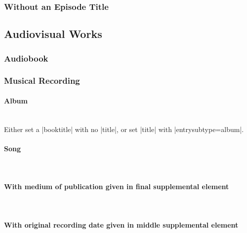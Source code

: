 \documentclass{ltxdockit}
\newcommand{\myparagraph}[1]{\paragraph{#1}\mbox{}\\}
\begin{document}
\subsubsection{Without an Episode Title} %
\label{sub:without_an_episode_title}
\begin{refsection}
	\printbibliography[heading=none]
\end{refsection}

\subsection{Audiovisual Works} %
\label{sec:audiovisual_works}
\subsubsection{Audiobook} %
\label{sub:audiobook}
\begin{refsection}
	\printbibliography[heading=none]
\end{refsection}
\subsubsection{Musical Recording} %
\label{sub:musical_recording}
\myparagraph{Album} %
\label{ssub:album}
Either set a |booktitle| with no |title|, or set |title| with  |entrysubtype={album}|.
\begin{refsection}
	\printbibliography[heading=none]
\end{refsection}
\myparagraph{Song} %
\label{ssub:song}
\begin{refsection}
	\printbibliography[heading=none]
\end{refsection}
\myparagraph{With medium of publication given in final supplemental element} %
\label{ssub:with_medium_of_publication_given_in_final_supplemental_element}
\begin{refsection}
	\printbibliography[heading=none]
\end{refsection}
\myparagraph{With original recording date given in middle supplemental element} %
\label{ssub:with_original_recording_date_given_in_middle_supplemental_element}
\begin{refsection}
	\printbibliography[heading=none]
\end{refsection}
\end{document}
